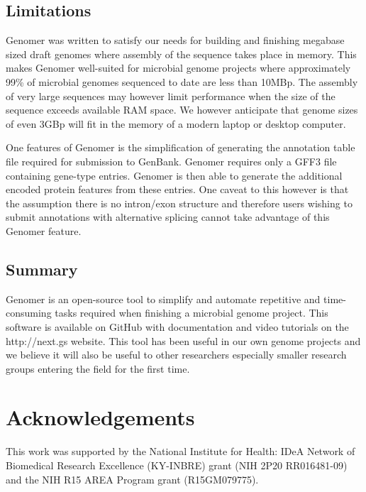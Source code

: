 \documentclass[10pt]{article}
\begin{document}
\subsection*{Limitations}

Genomer was written to satisfy our needs for building and finishing megabase
sized draft genomes where assembly of the sequence takes place in memory. This
makes Genomer well-suited for microbial genome projects where approximately
99\% of microbial genomes sequenced to date are less than 10MBp. The assembly
of very large sequences may however limit performance when the size of the
sequence exceeds available RAM space. We however anticipate that genome sizes
of even 3GBp will fit in the memory of a modern laptop or desktop computer.

One features of Genomer is the simplification of generating the annotation
table file required for submission to GenBank. Genomer requires only a GFF3
file containing gene-type entries. Genomer is then able to generate the
additional encoded protein features from these entries. One caveat to this
however is that the assumption there is no intron/exon structure and therefore
users wishing to submit annotations with alternative splicing cannot take
advantage of this Genomer feature.

\subsection*{Summary}

Genomer is an open-source tool to simplify and automate repetitive and
time-consuming tasks required when finishing a microbial genome project. This
software is available on GitHub \cite{genomer-github} with documentation and
video tutorials on the http://next.gs website. This tool has been useful in our
own genome projects and we believe it will also be useful to other researchers
especially smaller research groups entering the field for the first time.

\section*{Acknowledgements}

This work was supported by the National Institute for Health: IDeA Network of
Biomedical Research Excellence (KY-INBRE) grant (NIH 2P20 RR016481-09) and the
NIH R15 AREA Program grant (R15GM079775).


\end{document}
